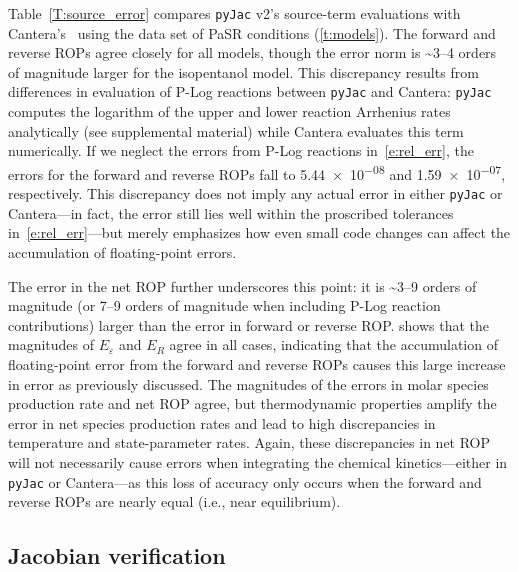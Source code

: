\documentclass[12pt,number,sort&compress,preprint]{elsarticle}
\newcommand{\revise}[1]{{\sloppy\textcolor{RoyalPurple}{#1}}}  %
\begin{document}
Table~\ref{T:source_error} compares \revise{\texttt{pyJac} v2's} source-term evaluations with Cantera's~\cite{Cantera} using the data set of PaSR conditions (\cref{t:models}).
\revise{The forward and reverse ROPs agree closely} for all models, though the error norm is \textasciitilde\numrange{3}{4} orders of magnitude larger for the isopentanol model.
This \revise{discrepancy} results from differences in evaluation of P-Log reactions between \texttt{pyJac} and Cantera: \texttt{pyJac} computes the logarithm of the upper and lower reaction Arrhenius rates analytically (see supplemental material) while Cantera evaluates this term numerically.
If we neglect the errors from P-Log reactions in~\cref{e:rel_err}, the errors for the forward and reverse ROPs fall to \num{5.44e-08} and \num{1.59e-07}, respectively.
This discrepancy does not imply any actual error in either \texttt{pyJac} or Cantera---in fact, the error still lies well within the proscribed tolerances in~\cref{e:rel_err}---but merely emphasizes
\revise{how even small code changes can affect the accumulation of floating-point errors.}

\revise{The error in the net ROP further underscores this point: it is}
\textasciitilde\numrange{3}{9} orders of magnitude (or \numrange{7}{9} orders of magnitude when including P-Log reaction contributions) larger than the error in forward or reverse ROP.
\revise{ shows that the magnitudes of $E_{\varepsilon}$ and $E_R$ agree} in all cases, indicating that the accumulation of floating-point error from the forward and reverse ROPs causes this large increase in error as previously discussed.
\revise{The magnitudes of the errors in molar species production rate and net ROP agree, but
thermodynamic properties amplify the error in net species production rates and lead to high discrepancies in temperature and state-parameter rates.}
Again, these discrepancies in net ROP will not necessarily cause errors when integrating the chemical kinetics---either in \texttt{pyJac} or Cantera---as this loss of accuracy only occurs when the forward and reverse ROPs are nearly equal \revise{(i.e., near equilibrium)}.

\subsection{Jacobian verification}
\label{S:jac_valid}
\end{document}
